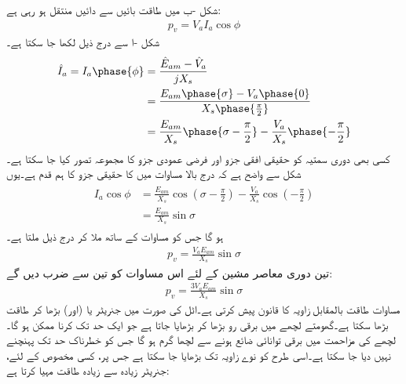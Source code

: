  شکل -ب میں طاقت  بائیں سے دائیں منتقل ہو رہی ہے:
\begin{align}\label{مساوات_معاصر_طاقت_کی_منتقلی_الف}
p_v=V_a I_a \cos \phi
\end{align}
شکل -ا سے درج ذیل لکھا جا سکتا ہے۔
\begin{gather}
\begin{aligned}
\hat{I}_a=I_a \phase{\phi}&=\frac{\hat{E}_{am}-\hat{V}_a}{j X_s}\\
&=\frac{E_{am} \phase{\sigma} -V_a \phase {0}}{X_s \phase{\frac{\pi}{2}}}\\
&=\frac{E_{am}}{X_s} \phase{\sigma-\frac{\pi}{2}} -\frac{V_a}{X_s} \phase {-\frac{\pi}{2}}
\end{aligned}
\end{gather}
کسی بھی  دوری سمتیہ کو  حقیقی افقی جزو اور فرضی عمودی جزو کا مجموعہ تصور کیا جا سکتا ہے۔شکل  سے واضح ہے کہ درج بالا مساوات میں  کا حقیقی جزو   کا ہم قدم ہے۔یوں 
\begin{gather}
\begin{aligned}
I_a \cos \phi&=\frac{E_{am}}{X_s} \cos \left(\sigma -\frac{\pi}{2} \right)-\frac{V_a}{X_s} \cos \left(-\frac{\pi}{2} \right)\\
&=\frac{E_{am}}{X_s} \sin \sigma
\end{aligned}
\end{gather}
ہو گا جس کو مساوات   کے ساتھ ملا کر درج ذیل ملتا ہے۔
\begin{align}\label{مساوات_معاصر_سائن_خصوصیات}
p_v=\frac{V_a E_{am}}{X_s} \sin \sigma
\end{align}
تین دوری معاصر مشین کے لئے اس مساوات کو تین سے ضرب دیں گے:
\begin{align}\label{مساوات_معاصر_طاقت_بالمقابل_زاویہ}
p_v=\frac{3 V_a E_{am}}{X_s} \sin \sigma
\end{align}
مساوات  طاقت بالمقابل زاویہ کا قانون پیش کرتی ہے۔اٹل  کی صورت میں جنریٹر  یا (اور)  بڑھا کر طاقت بڑھا سکتا ہے۔گھومتے لچھے میں برقی رو بڑھا کر   بڑھایا جاتا ہے جو ایک حد تک کرنا ممکن ہو گا۔ لچھے کی مزاحمت میں برقی توانائی ضائع ہونے سے لچھا گرم ہو گا جس کو خطرناک حد تک پہنچنے نہیں دیا جا سکتا ہے۔اسی طرح   کو نوے زاویہ تک بڑھایا  جا سکتا ہے جس پر، کسی مخصوص  کے لئے، جنریٹر زیادہ سے زیادہ طاقت مہیا کرتا ہے:
